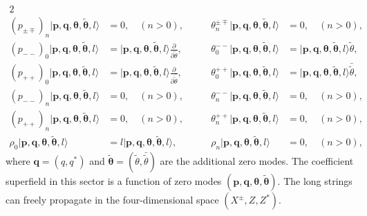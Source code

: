 \documentclass[a4paper,seceq,preprint]{ptptex}
\begin{document}
\begin{alignat}{2}
\nonumber\\
 (p_{\pm\mp})_n|\boldsymbol p,\boldsymbol q,
\boldsymbol\theta,\boldsymbol{\tilde\theta}
,l\rangle&=0,\quad (n> 0),&\qquad
 \theta^{\pm\mp}_n|\boldsymbol p,\boldsymbol q,
\boldsymbol\theta,\boldsymbol{\tilde\theta},l\rangle&=0,\quad (n>0),
\nonumber\\
 (p_{--})_0|\boldsymbol p,\boldsymbol q,
\boldsymbol\theta,\boldsymbol{\tilde\theta},l\rangle&=
|\boldsymbol p,\boldsymbol q,
\boldsymbol\theta,\boldsymbol{\tilde\theta}
,l\rangle\frac{\partial}{\partial\tilde\theta},&\qquad
 \theta^{--}_0|\boldsymbol p,\boldsymbol q,
\boldsymbol\theta,\boldsymbol{\tilde\theta}
,l\rangle&=|\boldsymbol p,\boldsymbol q,
\boldsymbol\theta,\boldsymbol{\tilde\theta},l\rangle
\tilde\theta,\nonumber\\
 (p_{++})_0|\boldsymbol p,\boldsymbol q,
\boldsymbol\theta,\boldsymbol{\tilde\theta},l\rangle&=
|\boldsymbol p,\boldsymbol q,\boldsymbol\theta,
\boldsymbol{\tilde\theta},l\rangle\frac{\partial}
{\partial\bar{\tilde\theta}},&\qquad
 \theta^{++}_0|\boldsymbol p,\boldsymbol q,
\boldsymbol\theta,\boldsymbol{\tilde\theta}
,l\rangle&=|\boldsymbol p,\boldsymbol q,
\boldsymbol\theta,\boldsymbol{\tilde\theta},l\rangle
 \bar{\tilde\theta},\nonumber\\
 (p_{--})_n|\boldsymbol p,\boldsymbol q,
\boldsymbol\theta,\boldsymbol{\tilde\theta}
,l\rangle&=0,\quad (n>0),&\qquad
 \theta^{--}_n|\boldsymbol p,\boldsymbol q,
\boldsymbol\theta,\boldsymbol{\tilde\theta},l\rangle&=0,\quad (n>0),
\nonumber\\
 (p_{++})_n|\boldsymbol p,\boldsymbol q,
\boldsymbol\theta,\boldsymbol{\tilde\theta}
,l\rangle&=0,\quad (n>0),&\qquad
 \theta^{++}_n|\boldsymbol p,\boldsymbol q,
\boldsymbol\theta,\boldsymbol{\tilde\theta},l\rangle&=0,\quad (n>0),
\nonumber\\
 \rho_0|\boldsymbol p,\boldsymbol q,
\boldsymbol\theta,\boldsymbol{\tilde\theta}
,l\rangle&=l|\boldsymbol p,\boldsymbol q,
\boldsymbol\theta,\boldsymbol{\tilde\theta}
,l\rangle,&\qquad
\rho_n|\boldsymbol p,\boldsymbol q,
\boldsymbol\theta,\boldsymbol{\tilde\theta}
,l\rangle&=0,\quad (n>0),
 \end{alignat} 
where $\boldsymbol q=(q,q^*)$ and $\boldsymbol{\tilde\theta}=
(\tilde\theta,\bar{\tilde\theta})$ are the additional zero modes.
The coefficient superfield in this sector is a function of 
zero modes $(\boldsymbol p,\boldsymbol q,
\boldsymbol\theta,\boldsymbol{\tilde\theta})$.
The long strings can freely propagate in the four-dimensional
space  $(X^\pm,Z,Z^*)$.
\end{document}
